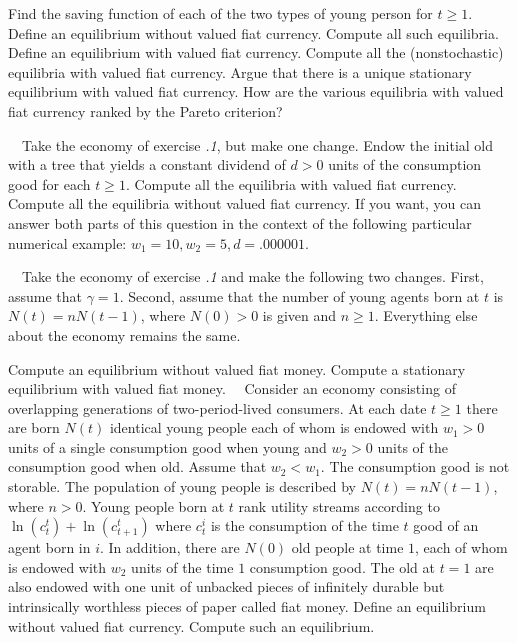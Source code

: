 \medskip
{}  Find the saving function of each of the two
types of young person for $t\geq 1$.
\medskip{}  Define an equilibrium without valued fiat currency.
Compute  all such equilibria.
\medskip
{}  Define an equilibrium with valued fiat currency.
\medskip
{}  Compute all the (nonstochastic) equilibria
with valued fiat currency.
\medskip
{}  Argue that there is a unique stationary equilibrium
with valued fiat currency.
\medskip
{}  How are the various equilibria  with valued
fiat currency ranked by
the Pareto criterion?

\bigskip
{} \ \   Take the economy of exercise
{\it \the\chapternum.1\/}, but make
one change.    Endow the initial old with a tree that
 yields a constant  dividend of $d >0$ units of the consumption
good for each $t \geq 1$.
\medskip
{}   Compute all  the equilibria with valued
fiat currency.
\medskip
{}  Compute all  the equilibria without valued
fiat currency.
\medskip
{}  If you want,  you can  answer both parts
of this question in the context of the following
particular  numerical
example:  $w_1 =10,   w_2 =5, d=.000001$.


\bigskip
{} \ \  Take the economy of exercise {\it \the\chapternum.1\/} and make
the following two changes. First, assume
that $\gamma=1$. Second, assume that the number of young
agents born at $t$ is $N(t) =n N(t-1)$, where $N(0) >0$ is
given and $n \geq 1$.    Everything else about the economy remains
the same.

\medskip
{}  Compute   an equilibrium without valued
fiat money.
\medskip
{}  Compute a stationary equilibrium  with valued
fiat money.
\bigskip
{} \ \  Consider an economy consisting of overlapping
generations of two-period-lived consumers.  At each date
$t\geq 1$ there are born $N(t)$ identical young people each of whom is
endowed with $w_1 >0$ units of a single consumption good when young
and $w_2 >0$ units of the consumption good when old.   Assume
that $w_2 < w_1$.    The consumption good is not storable.
The population of young people is described by
$N(t) = n N(t-1)$, where $n > 0$.   Young people
born at $t$ rank utility streams according to
$\ln(c^t_t) + \ln(c^t_{t+1})$ where $c^i_t$ is the consumption
of the time $t$ good of an agent born in $i$.    In addition,
there are $N(0)$ old people at time $1$, each of whom is
endowed with $w_2$ units of the time $1$ consumption good.
The old at $t=1$ are also endowed with one unit of  unbacked
pieces of infinitely durable but  intrinsically worthless pieces
of paper called fiat money.
\medskip
{}  Define an equilibrium without valued fiat
currency.   Compute such an equilibrium.

